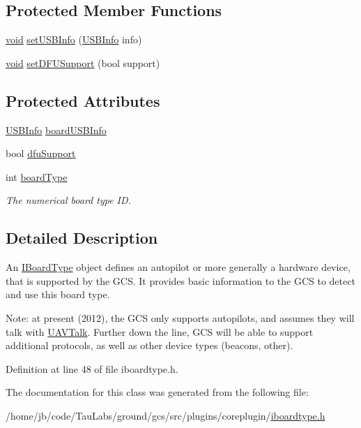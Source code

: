 \subsection*{\-Protected \-Member \-Functions}
\begin{DoxyCompactItemize}
\item 
\hyperlink{group___u_a_v_objects_plugin_ga444cf2ff3f0ecbe028adce838d373f5c}{void} \hyperlink{group___core_plugin_ga42daca6311468f194ca6fe21ba757739}{set\-U\-S\-B\-Info} (\hyperlink{struct_core_1_1_i_board_type_1_1_u_s_b_info}{\-U\-S\-B\-Info} info)
\item 
\hyperlink{group___u_a_v_objects_plugin_ga444cf2ff3f0ecbe028adce838d373f5c}{void} \hyperlink{group___core_plugin_gac9d8c69a2547553e8129adc61d57714f}{set\-D\-F\-U\-Support} (bool support)
\end{DoxyCompactItemize}
\subsection*{\-Protected \-Attributes}
\begin{DoxyCompactItemize}
\item 
\hyperlink{struct_core_1_1_i_board_type_1_1_u_s_b_info}{\-U\-S\-B\-Info} \hyperlink{group___core_plugin_ga240004d7cf24893e312b4c471e7d18c2}{board\-U\-S\-B\-Info}
\item 
bool \hyperlink{group___core_plugin_gada9001e6e7d55c7cee9b04f37597946c}{dfu\-Support}
\item 
int \hyperlink{group___core_plugin_gab9cad66a5d315e3e491293c989bc4e5a}{board\-Type}
\begin{DoxyCompactList}\small\item\em \-The numerical board type \-I\-D. \end{DoxyCompactList}\end{DoxyCompactItemize}


\subsection{\-Detailed \-Description}
\-An \hyperlink{class_core_1_1_i_board_type}{\-I\-Board\-Type} object defines an autopilot or more generally a hardware device, that is supported by the \-G\-C\-S. \-It provides basic information to the \-G\-C\-S to detect and use this board type.

\-Note\-: at present (2012), the \-G\-C\-S only supports autopilots, and assumes they will talk with \hyperlink{class_u_a_v_talk}{\-U\-A\-V\-Talk}. \-Further down the line, \-G\-C\-S will be able to support additional protocols, as well as other device types (beacons, other). 

\-Definition at line 48 of file iboardtype.\-h.



\-The documentation for this class was generated from the following file\-:\begin{DoxyCompactItemize}
\item 
/home/jb/code/\-Tau\-Labs/ground/gcs/src/plugins/coreplugin/\hyperlink{iboardtype_8h}{iboardtype.\-h}\end{DoxyCompactItemize}
